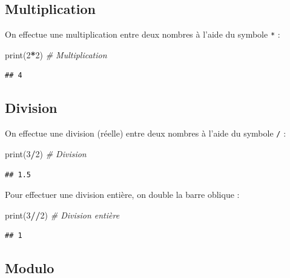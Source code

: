 \documentclass[
  12pt,
]{book}
\newenvironment{Shaded}{\begin{snugshade}}{\end{snugshade}}
\newcommand{\BuiltInTok}[1]{#1}
\newcommand{\CommentTok}[1]{\textcolor[rgb]{0.56,0.35,0.01}{\textit{#1}}}
\newcommand{\DecValTok}[1]{\textcolor[rgb]{0.00,0.00,0.81}{#1}}
\newcommand{\NormalTok}[1]{#1}
\newcommand{\OperatorTok}[1]{\textcolor[rgb]{0.81,0.36,0.00}{\textbf{#1}}}
\numberwithin{equation}{section}
\numberwithin{countremarque}{section}
\begin{document}
\subsection{Multiplication}\label{multiplication}

On effectue une multiplication entre deux nombres à l'aide du symbole \texttt{*} :

\begin{Shaded}
\begin{Highlighting}[]
\BuiltInTok{print}\NormalTok{(}\DecValTok{2}\OperatorTok{*}\DecValTok{2}\NormalTok{) }\CommentTok{\# Multiplication}
\end{Highlighting}
\end{Shaded}

\begin{lstlisting}
## 4
\end{lstlisting}

\subsection{Division}\label{division}

On effectue une division (réelle) entre deux nombres à l'aide du symbole \texttt{/} :

\begin{Shaded}
\begin{Highlighting}[]
\BuiltInTok{print}\NormalTok{(}\DecValTok{3}\OperatorTok{/}\DecValTok{2}\NormalTok{) }\CommentTok{\# Division}
\end{Highlighting}
\end{Shaded}

\begin{lstlisting}
## 1.5
\end{lstlisting}

Pour effectuer une division entière, on double la barre oblique :

\begin{Shaded}
\begin{Highlighting}[]
\BuiltInTok{print}\NormalTok{(}\DecValTok{3}\OperatorTok{//}\DecValTok{2}\NormalTok{) }\CommentTok{\# Division entière}
\end{Highlighting}
\end{Shaded}

\begin{lstlisting}
## 1
\end{lstlisting}

\subsection{Modulo}\label{modulo}
\end{document}
